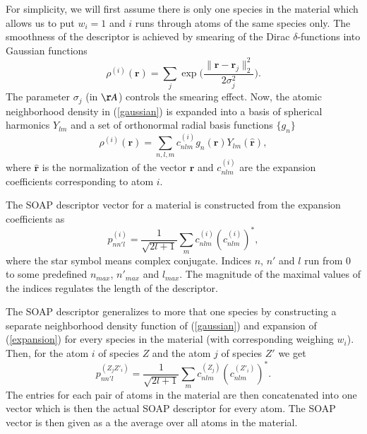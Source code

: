 \documentclass[11pt,oneside,czech,american]{book} %
\theoremstyle{definition} %
\theoremstyle{definition}
\begin{document}
For simplicity, we will first assume there is only one species in the material which allows us to put $w_{i} = 1$ and $i$ runs through atoms of the same species only. The smoothness of the descriptor is achieved by smearing of the Dirac $\delta$-functions into Gaussian functions
\begin{equation}
	\rho^{(i)}(\bm{r}) = \sum_{j} \exp\Bigg(\frac{\lVert \bm{r} - \bm{r}_j \rVert^2_2}{2\sigma^2_j}\Bigg).
	\label{gaussian}
\end{equation}
The parameter $\sigma_j$ (in $\AA$) controls the smearing effect. Now, the atomic neighborhood density in (\ref{gaussian}) is expanded into a basis of spherical harmonics $Y_{lm}$ and a set of orthonormal radial basis functions $\{g_n\}$
\begin{equation}
	\rho^{(i)} (\bm{r}) = \sum_{n,l,m} c^{(i)}_{nlm} g_n (\bm{r}) Y_{lm} (\bm{\hat{r}}),
	\label{expansion}
\end{equation}
where $\bm{\hat{r}}$ is the normalization of the vector $\bm{r}$ and $c^{(i)}_{nlm}$ are the expansion coefficients corresponding to atom $i$.

The SOAP descriptor vector for a material is constructed from the expansion coefficients as
\begin{equation}
p^{(i)}_{n n' l} = \frac{1}{\sqrt{2l+1}} \sum_{m} c^{(i)}_{nlm} (c^{(i)}_{nlm})^{*},
\label{soap_one}
\end{equation}
where the star symbol means complex conjugate. Indices $n$, $n'$ and $l$ run from 0 to some predefined $n_{max}$, $n'_{max}$ and $l_{max}$. The magnitude of the maximal values of the indices regulates the length of the descriptor.

The SOAP descriptor generalizes to more that one species by constructing a separate neighborhood density function of (\ref{gaussian}) and expansion of (\ref{expansion}) for every species in the material (with corresponding weighing $w_i$). Then, for the atom $i$ of species $Z$ and the atom $j$ of species $Z'$ we get
\begin{equation}
	p^{(Z_j Z'_i)}_{n n' l} = \frac{1}{\sqrt{2l+1}} \sum_{m} c^{(Z_j)}_{nlm} (c^{(Z'_i)}_{nlm})^{*}.
	\label{soap_many}
\end{equation}
The entries for each pair of atoms in the material are then concatenated into one vector which is then the actual SOAP descriptor for every atom. The SOAP vector is then given as a the average over all atoms in the material.
\end{document}
